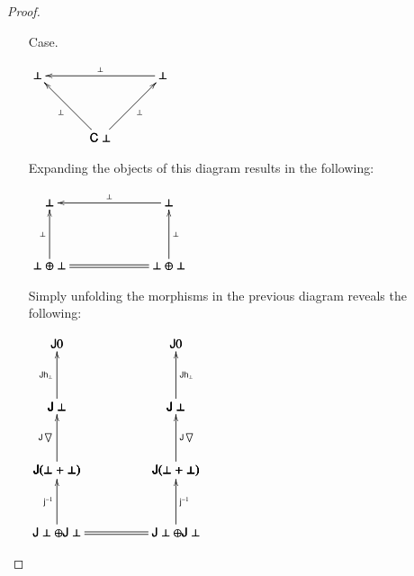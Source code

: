 \documentclass{lmcs}
\let\t\relax
\let\r\relax
\let\c\relax
\let\wn\relax
\let\H\relax
\newcommand{\func}[1]{\mathsf{#1}}
\newcommand{\H}[0]{\func{H}}
\newcommand{\J}[0]{\func{J}}
\newcommand{\h}[1]{\mathsf{h}_{#1}}
\newcommand{\t}[0]{\mathsf{t}}
\newcommand{\r}[1]{\mathsf{r}_{#1}}
\newcommand{\c}[1]{\mathsf{c}_{#1}}
\newcommand{\jinv}[1]{\mathsf{j}^{-1}_{#1}}
\newcommand{\wn}[0]{\mathop{?}}
\newcommand{\codiag}[1]{\bigtriangledown_{#1}}
\newenvironment{diagram}{
  \begin{center}
    \begin{math}
      \bfig
}{
      \efig
    \end{math}
  \end{center}
}
\begin{document}
\begin{proof}
\begin{itemize}
\begin{itemize}
    \item[Case.] \ \\
      \begin{diagram}
        \Vtriangle/<-`<-`<-/[
          \perp`
          \wn \perp`
          \func{C} \perp;
          \r{\perp}`
          \t{\perp}`
          \c{\perp}]
      \end{diagram}
      Expanding the objects of this diagram results in the following:
      \begin{diagram}
        \square/<-`<-`<-`=/<950,500>[
          \perp`
          \wn \perp`
          \wn \perp \oplus \wn \perp`
          \wn \perp \oplus \wn \perp;
          \r{\perp}`
          \t{\perp}`
          \c{\perp}`]          
      \end{diagram}
      Simply unfolding the morphisms in the previous diagram reveals the following:
      \begin{diagram}
        \square/`<-`<-`=/<950,500>[
          \J(\H\perp + \H\perp)`
          \J(\H\perp + \H\perp)`
          \J\H\perp \oplus \J\H\perp`
          \J\H\perp \oplus \J\H\perp;`
          \jinv{}`
          \jinv{}`]

        \square(0,500)/`<-`<-`/<950,500>[
          \J\H\perp`
          \J\H\perp`
          \J(\H\perp + \H\perp)`
          \J(\H\perp + \H\perp);
          `
          \J\codiag{}`
          \J\codiag{}`]

        \square(0,1000)/`<-`<-`/<950,500>[
          \J0`
          \J0`
          \J\H\perp`
          \J\H\perp;
          `
          \J\h{\perp}`
          \J\h{\perp}`]


\end{diagram}
\end{itemize}
\end{itemize}
\end{proof}
\end{document}
